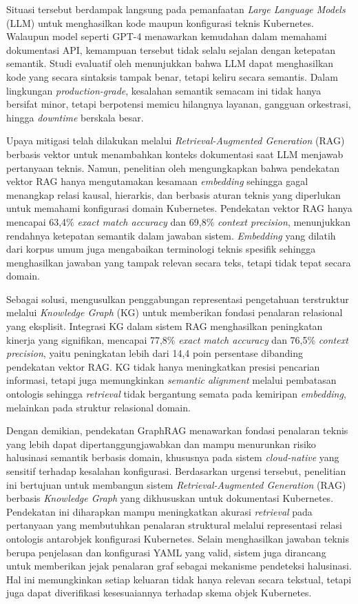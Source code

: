 Situasi tersebut berdampak langsung pada pemanfaatan \textit{Large Language Models} (LLM) untuk menghasilkan kode maupun konfigurasi teknis Kubernetes. Walaupun model seperti GPT-4 menawarkan kemudahan dalam memahami dokumentasi API, kemampuan tersebut tidak selalu sejalan dengan ketepatan semantik. Studi evaluatif oleh \textcite{liu2024deepanalysis} menunjukkan bahwa LLM dapat menghasilkan kode yang secara sintaksis tampak benar, tetapi keliru secara semantis. Dalam lingkungan \textit{production-grade}, kesalahan semantik semacam ini tidak hanya bersifat minor, tetapi berpotensi memicu hilangnya layanan, gangguan orkestrasi, hingga \textit{downtime} berskala besar.

Upaya mitigasi telah dilakukan melalui \textit{Retrieval-Augmented Generation} (RAG) berbasis vektor untuk menambahkan konteks dokumentasi saat LLM menjawab pertanyaan teknis. Namun, penelitian oleh \textcite{wan2025empowering} mengungkapkan bahwa pendekatan vektor RAG hanya mengutamakan kesamaan \textit{embedding} sehingga gagal menangkap relasi kausal, hierarkis, dan berbasis aturan teknis yang diperlukan untuk memahami konfigurasi domain Kubernetes. Pendekatan vektor RAG hanya mencapai 63,4\% \textit{exact match accuracy} dan 69,8\% \textit{context precision}, menunjukkan rendahnya ketepatan semantik dalam jawaban sistem. \textit{Embedding} yang dilatih dari korpus umum juga mengabaikan terminologi teknis spesifik sehingga menghasilkan jawaban yang tampak relevan secara teks, tetapi tidak tepat secara domain.

Sebagai solusi, \textcite{wan2025empowering} mengusulkan penggabungan representasi pengetahuan terstruktur melalui \textit{Knowledge Graph} (KG) untuk memberikan fondasi penalaran relasional yang eksplisit. Integrasi KG dalam sistem RAG menghasilkan peningkatan kinerja yang signifikan, mencapai 77,8\% \textit{exact match accuracy} dan 76,5\% \textit{context precision}, yaitu peningkatan lebih dari 14,4 poin persentase dibanding pendekatan vektor RAG. KG tidak hanya meningkatkan presisi pencarian informasi, tetapi juga memungkinkan \textit{semantic alignment} melalui pembatasan ontologis sehingga \textit{retrieval} tidak bergantung semata pada kemiripan \textit{embedding}, melainkan pada struktur relasional domain. 

Dengan demikian, pendekatan GraphRAG menawarkan fondasi penalaran teknis yang lebih dapat dipertanggungjawabkan dan mampu menurunkan risiko halusinasi semantik berbasis domain, khususnya pada sistem \textit{cloud-native} yang sensitif terhadap kesalahan konfigurasi. Berdasarkan urgensi tersebut, penelitian ini bertujuan untuk membangun sistem \textit{Retrieval-Augmented Generation} (RAG) berbasis \textit{Knowledge Graph} yang dikhususkan untuk dokumentasi Kubernetes. Pendekatan ini diharapkan mampu meningkatkan akurasi \textit{retrieval} pada pertanyaan yang membutuhkan penalaran struktural melalui representasi relasi ontologis antarobjek konfigurasi Kubernetes. Selain menghasilkan jawaban teknis berupa penjelasan dan konfigurasi YAML yang valid, sistem juga dirancang untuk memberikan jejak penalaran graf sebagai mekanisme pendeteksi halusinasi. Hal ini memungkinkan setiap keluaran tidak hanya relevan secara tekstual, tetapi juga dapat diverifikasi kesesuaiannya terhadap skema objek Kubernetes.

